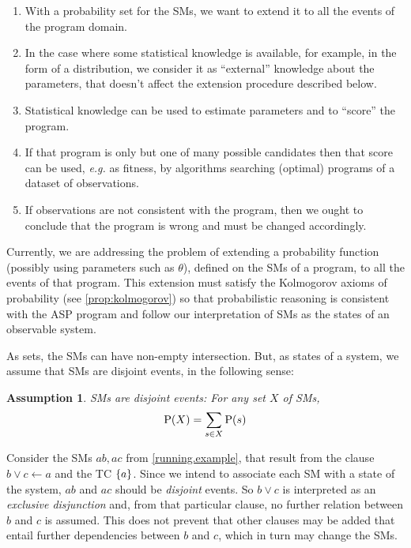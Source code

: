 \documentclass[a4paper, 10pt]{article}
\newtheorem{assumption}{Assumption}
\newcommand{\at}[1]{\ensuremath{\!\del{#1}}}
\newcommand{\pr}[1]{\ensuremath{\mathrm{P}\at{#1}}}
\begin{document}
\begin{enumerate}

    \item With a probability set for the \aclp{SM}, we want to extend it to all the events of the program domain.

    \item In the case where some statistical knowledge is available, for example, in the form of a distribution, we consider it as ``external'' knowledge about the parameters, that doesn't affect the extension procedure described below.

    \item Statistical knowledge can be used to estimate parameters and to ``score'' the program.

    \item\label{item:program.selection} If that program is only but one of many possible candidates then that score can be used, \emph{e.g.} as fitness, by algorithms searching (optimal) programs of a dataset of observations.

    \item  If observations are not consistent with the program, then we ought to conclude that the program is wrong and must be changed accordingly.
\end{enumerate}

Currently, we are addressing the problem of extending a probability function (possibly using parameters such as $\theta$), defined on the \acp{SM} of a program, to all the events of that program. This extension must satisfy the Kolmogorov axioms of probability (see \cref{prop:kolmogorov}) so that probabilistic reasoning is consistent with the \ac{ASP} program and follow our interpretation of \aclp{SM} as the states of an observable system.

As sets, the \acp{SM} can have non-empty intersection. But, as states of a system, we assume that \acp{SM} are disjoint events, in the following sense:

\begin{assumption}\label{assumption:smodels.disjoint}
    \Aclp{SM} are disjoint events: For any set $X$ of \aclp{SM},
    \begin{equation}
        \pr{X} = \sum_{s\in X}\pr{s}
    \end{equation}
\end{assumption}

Consider the \aclp{SM} $ab, ac$ from \cref{running.example}, that result from the clause $b \vee c \leftarrow a$ and the \acl{TC} $\set{a}$. Since we intend to associate each \acl{SM} with a state of the system, $ab$ and $ac$ should be \emph{disjoint} events. So $b \vee c$ is interpreted as an \emph{exclusive disjunction} and, from that particular clause, no further relation between $b$ and $c$ is assumed. This does not prevent that other clauses may be added that entail further dependencies between $b$ and $c$, which in turn may change the \aclp{SM}.
\end{document}
